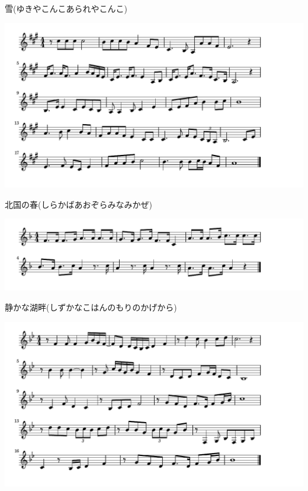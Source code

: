 \documentclass[a4paper]{ltjsarticle}
\begin{document}
\vspace{-10mm} \hspace{10mm}
雪(ゆきやこんこあられやこんこ)

\includegraphics[clip]{kitaguninoharu_crop.pdf}

\vspace{-10mm} \hspace{10mm}
北国の春(しらかばあおぞらみなみかぜ)

\includegraphics[clip]{shizukanakohan_crop.pdf}

\vspace{-10mm} \hspace{10mm}
静かな湖畔(しずかなこはんのもりのかげから)

\includegraphics[clip]{onnanomichi_crop.pdf}
\end{document}
